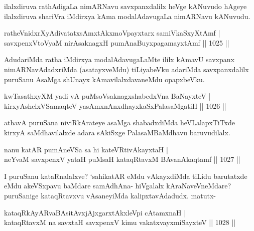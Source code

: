 \begin{artha}
ilalxdiruva rathAdigaLa nimARNavu savxpanxdalilx heVge kANuvudo hAgeye ilalxdiruva shariVra iMdirxya kAma modalAdavugaLa nimARNavu kANuvudu.
\end{artha}

\begin{shl}
ratheVnidxrXyAdivatatxsAmxtAkxmoV\s payxtarx samiVkaSxyXtAmf | \\
savxpenxV\s toV\s yaM nirAsaknagxH pumAnaBuyxpagamayxtAmf \hfill||  1025 ||  
\end{shl}

\begin{artha}
AdudariMda ratha iMdirxya modalAdavugaLaMte ililx kAmavU savxpanx nimARNavAdadxriMda (asatayxveMdu) tiLiyabeVku adariMda savxpanxdalilx puruSanu AsaMga shUnayx kAmavilalxdavaneMdu opapxbeVku.
\end{artha}


\begin{shl}
kwTasathxyXM yadi vA puMsoV\s saknagxshabedxVna BaNayxteV | \\
kirxyA\footnotemark[1]shelxVSamaqteV yasAmxnAnxdhayxkaSxPalasaMgatiH \hfill||  1026 ||  
\end{shl}

\begin{artha}
athavA puruSana niviRkArateye asaMga shabadxdiMda heVLalapxTiTxde kirxyA saMdhavilalxde adara sAkiSxge PalasaMBaMdhavu baruvudilalx.
\end{artha}


\begin{shl}
nanu katAR pumAneVSa sa hi kateVRtivAkayxtaH | \\
neYvaM savxpenxV yataH puMsaH kataqRtavxM BAvanAkaqtamf \hfill||  1027 ||  
\end{shl}

\begin{artha}
I puruSanu kataRnalalxve? `sahikatAR eMdu vAkayxdiMda tiLidu barutatxde eMdu akeVSxpavu baMdare samAdhAna- hiVgalalx kAraNaveVneMdare? puruSanige kataqRtavxvu vAsaneyiMda kalipxtavAdadudx. matutx-
\end{artha}

\begin{shl}
kataqRkAyARvaBAsitAvxjAjxgarxtAkxleV\s pi cA\s \s tamxnaH | \\
kataqRtavxM na savxtaH savxpenxV kimu vakatxvayxmiSayxteV \hfill||  1028 ||  
\end{shl}

